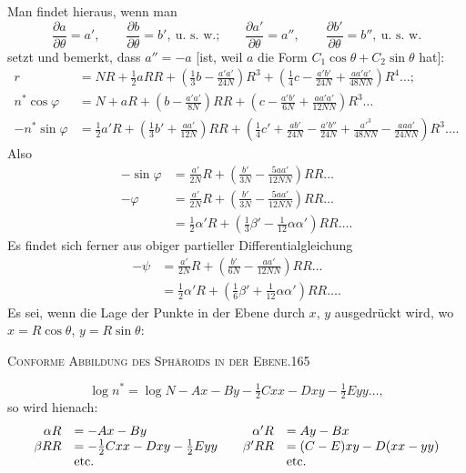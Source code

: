Man findet hieraus, wenn man
\[
\frac{\partial a}{\partial\theta}=a',\qquad\frac{\partial b}{\partial\theta}=b',\ \text{u. s. w.;}\qquad
\frac{\partial a'}{\partial\theta}=a'',\qquad\frac{\partial b'}{\partial\theta}=b'',\ \text{u. s. w.}
\]
setzt und bemerkt, dass $a''=-a$ [ist, weil $a$ die Form $C_1\cos\theta+C_2\sin\theta$ hat]:
\[
\begin{aligned}
r&=NR+\tfrac12aRR+\left(\tfrac13b-\frac{a'a'}{24N}\right)R^3+\left(\tfrac14c-\frac{a'b'}{24N}+\frac{aa'a'}{48NN}\right)R^4\ldots;\\
n^*\cos\varphi&=N+aR+\left(b-\frac{a'a'}{8N}\right)RR+\left(c-\frac{a'b'}{6N}+\frac{aa'a'}{12NN}\right)R^3\ldots\\
-n^*\sin\varphi&=\tfrac12a'R+\left(\tfrac13b'+\frac{aa'}{12N}\right)RR
+\left(\tfrac14c'+\frac{ab'}{24N}-\frac{a'b''}{24N}+\frac{{a'}^3}{48NN}-\frac{aaa'}{24NN}\right)R^3\ldots.
\end{aligned}
\]
Also
\[
\begin{aligned}
-\sin\varphi&=\frac{a'}{2N}R+\left(\frac{b'}{3N}-\frac{5aa'}{12NN}\right)RR\ldots\\
-\varphi&=\frac{a'}{2N}R+\left(\frac{b'}{3N}-\frac{5aa'}{12NN}\right)RR\ldots\\
&=\tfrac12\alpha'R+\left(\tfrac13\beta'-\tfrac1{12}\alpha\alpha'\right)RR\ldots.
\end{aligned}
\]
Es findet sich ferner aus obiger partieller Differentialgleichung
\[
\begin{aligned}
-\psi&=\frac{a'}{2N}R+\left(\frac{b'}{6N}-\frac{aa'}{12NN}\right)RR\ldots\\
&=\tfrac12\alpha'R+\left(\tfrac16\beta'+\tfrac1{12}\alpha\alpha'\right)RR\ldots.
\end{aligned}
\]
Es sei, wenn die Lage der Punkte in der Ebene durch $x$, $y$ ausgedrückt wird, wo $x=R\cos\theta$, $y=R\sin\theta$:
\par\endgroup
\clearpage
\noindent\mbox{}\hfill\textsc{Conforme Abbildung des Sphäroids in der Ebene.}\hfill165\par\medskip
\begingroup\small
\[
\log n^*=\log N-Ax-By-\tfrac12Cxx-Dxy-\tfrac12Eyy\ldots,
\]
so wird hienach:
\[
\begin{array}{rl@{\qquad}rl}
\alpha R&=-Ax-By&\alpha'R&=Ay-Bx\\
\beta RR&=-\tfrac12Cxx-Dxy-\tfrac12Eyy&\beta'RR&=(C-E)xy-D(xx-yy)\\
&\text{etc.}&&\text{etc.}
\end{array}
\]
